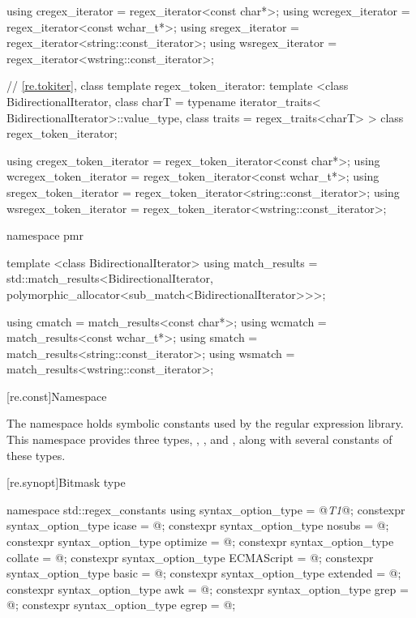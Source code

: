 \begin{codeblock}
{  using cregex_iterator  = regex_iterator<const char*>;
  using wcregex_iterator = regex_iterator<const wchar_t*>;
  using sregex_iterator  = regex_iterator<string::const_iterator>;
  using wsregex_iterator = regex_iterator<wstring::const_iterator>;

  // \ref{re.tokiter}, class template regex_token_iterator:
  template <class BidirectionalIterator, 
            class charT = typename iterator_traits<
              BidirectionalIterator>::value_type,
            class traits = regex_traits<charT> >
    class regex_token_iterator;

  using cregex_token_iterator  = regex_token_iterator<const char*>;
  using wcregex_token_iterator = regex_token_iterator<const wchar_t*>;
  using sregex_token_iterator  = regex_token_iterator<string::const_iterator>;
  using wsregex_token_iterator = regex_token_iterator<wstring::const_iterator>;

  namespace pmr {
    template <class BidirectionalIterator>
      using match_results =
        std::match_results<BidirectionalIterator,
                           polymorphic_allocator<sub_match<BidirectionalIterator>>>;

    using cmatch  = match_results<const char*>;
    using wcmatch = match_results<const wchar_t*>;
    using smatch  = match_results<string::const_iterator>;
    using wsmatch = match_results<wstring::const_iterator>;
  }
}
\end{codeblock}

[re.const]{Namespace }

\pnum
{}%
The namespace  holds
symbolic constants used by the regular expression library.  This
namespace provides three types, , 
, and , along with several
constants of these types.

[re.synopt]{Bitmask type }
%
%
\begin{codeblock}
namespace std::regex_constants {
  using syntax_option_type = @\textit{T1}@;
  constexpr syntax_option_type icase = @\unspec@;
  constexpr syntax_option_type nosubs = @\unspec@;
  constexpr syntax_option_type optimize = @\unspec@;
  constexpr syntax_option_type collate = @\unspec@;
  constexpr syntax_option_type ECMAScript = @\unspec@;
  constexpr syntax_option_type basic = @\unspec@;
  constexpr syntax_option_type extended = @\unspec@;
  constexpr syntax_option_type awk = @\unspec@;
  constexpr syntax_option_type grep = @\unspec@;
  constexpr syntax_option_type egrep = @\unspec@;
}
\end{codeblock}

